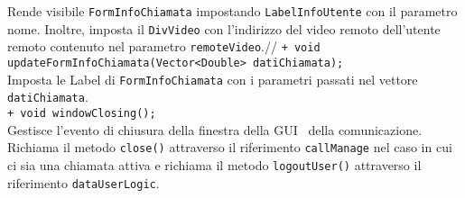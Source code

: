 {\begin{sloppypar}
{\begin{itemize}
\begin{itemize}
				Rende visibile \texttt{FormInfoChiamata} impostando \texttt{LabelInfoUtente} con il parametro nome. Inoltre, 
				imposta il \texttt{DivVideo} con l’indirizzo del video remoto dell’utente remoto contenuto nel parametro \texttt{remoteVideo}.//
				\texttt{+ void updateFormInfoChiamata(Vector<Double> datiChiamata);}\\
				Imposta le Label di \texttt{FormInfoChiamata} con i parametri passati nel vettore \texttt{datiChiamata}.\\
				\texttt{+ void windowClosing();}\\
				Gestisce l'evento di chiusura della finestra della GUI\g~ della comunicazione. Richiama il metodo \texttt{close()} attraverso il riferimento \texttt{callManage} nel caso in cui ci sia una chiamata attiva e
				richiama il metodo \texttt{logoutUser()} attraverso il riferimento \texttt{dataUserLogic}.\\
	

\end{itemize}
\end{itemize}}
\end{sloppypar}}
